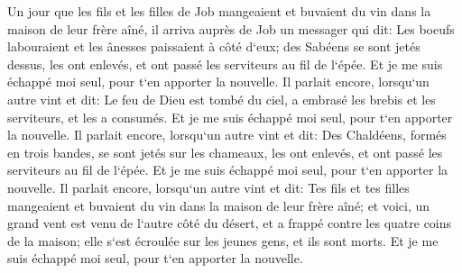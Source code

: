 \verse Un jour que les fils et les filles de Job mangeaient et buvaient du vin dans la maison de leur frère aîné, 
\verse il arriva auprès de Job un messager qui dit: Les boeufs labouraient et les ânesses paissaient à côté d`eux; 
\verse des Sabéens se sont jetés dessus, les ont enlevés, et ont passé les serviteurs au fil de l`épée. Et je me suis échappé moi seul, pour t`en apporter la nouvelle. 
\verse Il parlait encore, lorsqu`un autre vint et dit: Le feu de Dieu est tombé du ciel, a embrasé les brebis et les serviteurs, et les a consumés. Et je me suis échappé moi seul, pour t`en apporter la nouvelle. 
\verse Il parlait encore, lorsqu`un autre vint et dit: Des Chaldéens, formés en trois bandes, se sont jetés sur les chameaux, les ont enlevés, et ont passé les serviteurs au fil de l`épée. Et je me suis échappé moi seul, pour t`en apporter la nouvelle. 
\verse Il parlait encore, lorsqu`un autre vint et dit: Tes fils et tes filles mangeaient et buvaient du vin dans la maison de leur frère aîné; 
\verse et voici, un grand vent est venu de l`autre côté du désert, et a frappé contre les quatre coins de la maison; elle s`est écroulée sur les jeunes gens, et ils sont morts. Et je me suis échappé moi seul, pour t`en apporter la nouvelle. 
